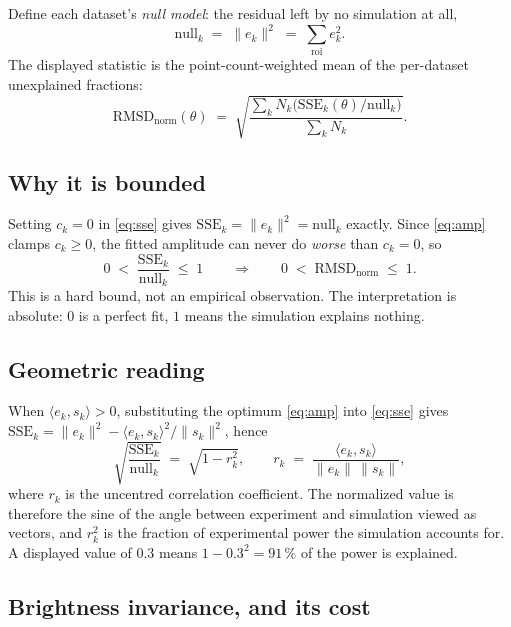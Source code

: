 \documentclass[11pt,a4paper]{article}
\newcommand{\SSE}{\mathrm{SSE}}
\newcommand{\RMSD}{\mathrm{RMSD}}
\begin{document}
Define each dataset's \emph{null model}: the residual left by no simulation
at all,
\begin{equation}
\mathrm{null}_k \;=\; \lVert e_k \rVert^{2} \;=\; \sum_{\text{roi}} e_k^2 .
\end{equation}
The displayed statistic is the point-count-weighted mean of the per-dataset
unexplained fractions:
\begin{equation}
\RMSD_{\text{norm}}(\theta) \;=\;
\sqrt{\frac{\sum_k N_k \bigl(\SSE_k(\theta)/\mathrm{null}_k\bigr)}
{\sum_k N_k}} .
\label{eq:norm}
\end{equation}

\subsection{Why it is bounded}

Setting $c_k=0$ in \eqref{eq:sse} gives $\SSE_k=\lVert e_k\rVert^2 =
\mathrm{null}_k$ exactly. Since \eqref{eq:amp} clamps $c_k\ge 0$, the fitted
amplitude can never do \emph{worse} than $c_k=0$, so
\begin{equation}
0 \;<\; \frac{\SSE_k}{\mathrm{null}_k} \;\le\; 1
\qquad\Longrightarrow\qquad
0 \;<\; \RMSD_{\text{norm}} \;\le\; 1 .
\end{equation}
This is a hard bound, not an empirical observation. The interpretation is
absolute: $0$ is a perfect fit, $1$ means the simulation explains nothing.

\subsection{Geometric reading}

When $\langle e_k,s_k\rangle>0$, substituting the optimum \eqref{eq:amp}
into \eqref{eq:sse} gives
$\SSE_k = \lVert e_k\rVert^2 - \langle e_k,s_k\rangle^2/\lVert s_k\rVert^2$,
hence
\begin{equation}
\sqrt{\frac{\SSE_k}{\mathrm{null}_k}} \;=\; \sqrt{1-r_k^{2}},
\qquad
r_k \;=\; \frac{\langle e_k, s_k\rangle}
{\lVert e_k\rVert\,\lVert s_k\rVert},
\label{eq:sin}
\end{equation}
where $r_k$ is the uncentred correlation coefficient. The normalized value
is therefore the sine of the angle between experiment and simulation viewed
as vectors, and $r_k^2$ is the fraction of experimental power the simulation
accounts for. A displayed value of $0.3$ means $1-0.3^2 = 91\,\%$ of the
power is explained.

\subsection{Brightness invariance, and its cost}
\label{sec:brightness}
\end{document}
